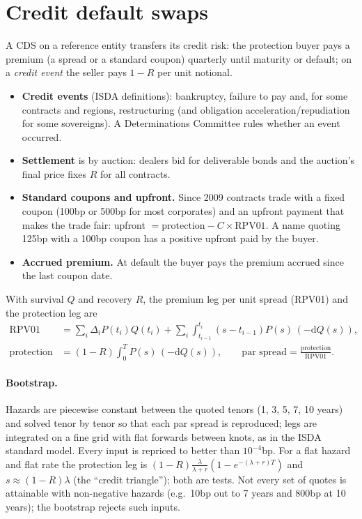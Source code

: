 \documentclass[11pt,a4paper]{article}
\begin{document}
\section{Credit default swaps}
A CDS on a reference entity transfers its credit risk: the protection buyer pays a premium (a spread
or a standard coupon) quarterly until maturity or default; on a \emph{credit event} the seller pays
$1-R$ per unit notional.
\begin{itemize}[nosep]
\item \textbf{Credit events} (ISDA definitions): bankruptcy, failure to pay and, for some contracts
and regions, restructuring (and obligation acceleration/repudiation for some sovereigns). A
Determinations Committee rules whether an event occurred.
\item \textbf{Settlement} is by auction: dealers bid for deliverable bonds and the auction's final
price fixes $R$ for all contracts.
\item \textbf{Standard coupons and upfront.} Since 2009 contracts trade with a fixed coupon (100bp or
500bp for most corporates) and an upfront payment that makes the trade fair:
upfront $=\text{protection}-C\times\mathrm{RPV01}$. A name quoting 125bp with a 100bp coupon has a positive
upfront paid by the buyer.
\item \textbf{Accrued premium.} At default the buyer pays the premium accrued since the last coupon date.
\end{itemize}
With survival $Q$ and recovery $R$, the premium leg per unit spread (RPV01) and the protection leg are
\begin{align*}
\mathrm{RPV01}&=\sum_i\Delta_iP(t_i)Q(t_i)+\sum_i\int_{t_{i-1}}^{t_i}(s-t_{i-1})P(s)\,(-\mathrm dQ(s)),\\
\text{protection}&=(1-R)\int_0^TP(s)\,(-\mathrm dQ(s)),\qquad\text{par spread}=\frac{\text{protection}}{\mathrm{RPV01}}.
\end{align*}
\paragraph{Bootstrap.} Hazards are piecewise constant between the quoted tenors (1, 3, 5, 7, 10 years)
and solved tenor by tenor so that each par spread is reproduced; legs are integrated on a fine grid
with flat forwards between knots, as in the ISDA standard model. Every input is repriced to better
than $10^{-4}$bp. For a flat hazard and flat rate the protection leg is
$(1-R)\frac{\lambda}{\lambda+r}(1-e^{-(\lambda+r)T})$ and $s\approx(1-R)\lambda$ (the ``credit triangle''); both are tests.
Not every set of quotes is attainable with non-negative hazards (e.g.\ 10bp out to 7 years and 800bp at
10 years); the bootstrap rejects such inputs.
\end{document}
